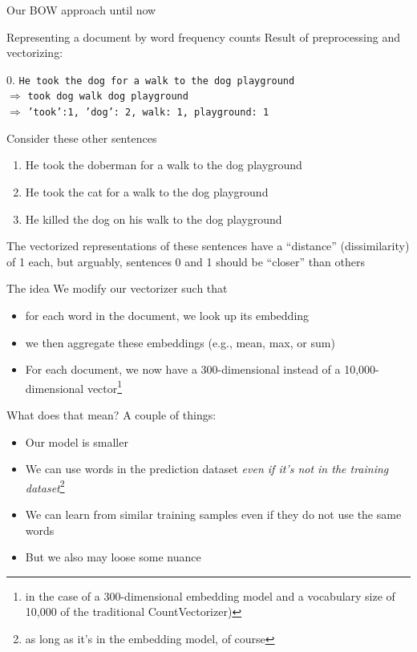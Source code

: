 \begin{frame}{Our BOW approach until now}
	\begin{block}{Representing a document by word frequency counts}
		Result of preprocessing and vectorizing:
		
		0. \texttt{He took the dog for a walk to the dog playground}\\
		$\Rightarrow$ \texttt{took dog walk dog playground}\\
		$\Rightarrow$ \texttt{'took':1, 'dog': 2, walk: 1, playground: 1}
	\end{block}
	
	Consider these other sentences
	\begin{enumerate}
		\item He took the doberman for a walk to the dog playground
		\item He took the cat for a walk to the dog playground
		\item He killed the dog on his walk to the dog playground 
	\end{enumerate}
	
	The vectorized representations of these sentences have a ``distance'' (dissimilarity) of 1 each, but arguably, sentences 0 and 1 should be ``closer'' than others
	
\end{frame}


\begin{frame}{The idea}
	We modify our vectorizer such that
	\begin{itemize}[<+->]
		\item for each word in the document, we look up its embedding
		\item we then aggregate these embeddings (e.g., mean, max, or sum)
		\item For each document, we now have a 300-dimensional instead of a 10,000-dimensional vector\footnote{in the case of a 300-dimensional embedding model and a vocabulary size of 10,000 of the traditional CountVectorizer)}
	\end{itemize}
	
\end{frame}



\begin{frame}{What does that mean?}
	A couple of things:
	\begin{itemize}[<+->]
		\item Our model is smaller
		\item We can use words in the prediction dataset \emph{even if it's not in the training dataset}\footnote{as long as it's in the embedding model, of course}
		\item We can learn from similar training samples even if they do not use the same words
		\item But we also may loose some nuance
	\end{itemize}
\end{frame}




